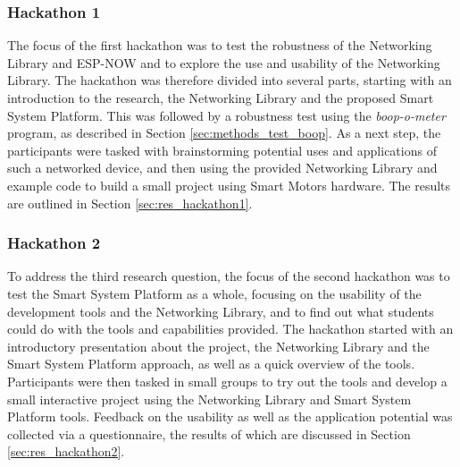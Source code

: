 \subsubsection{\label{sec:methods_hackathon1}Hackathon 1}
The focus of the first hackathon was to test the robustness of the Networking Library and ESP-NOW and to explore the use and usability of the Networking Library. The hackathon was therefore divided into several parts, starting with an introduction to the research, the Networking Library and the proposed Smart System Platform. This was followed by a robustness test using the \textit{boop-o-meter} program, as described in Section \ref{sec:methods_test_boop}. As a next step, the participants were tasked with brainstorming potential uses and applications of such a networked device, and then using the provided Networking Library and example code to build a small project using Smart Motors hardware. The results are outlined in Section \ref{sec:res_hackathon1}.

\subsubsection{\label{sec:methods_hackathon2}Hackathon 2}
To address the third research question, the focus of the second hackathon was to test the Smart System Platform as a whole, focusing on the usability of the development tools and the Networking Library, and to find out what students could do with the tools and capabilities provided. The hackathon started with an introductory presentation about the project, the Networking Library and the Smart System Platform approach, as well as a quick overview of the tools. Participants were then tasked in small groups to try out the tools and develop a small interactive project using the Networking Library and Smart System Platform tools. Feedback on the usability as well as the application potential was collected via a questionnaire, the results of which are discussed in Section \ref{sec:res_hackathon2}.



